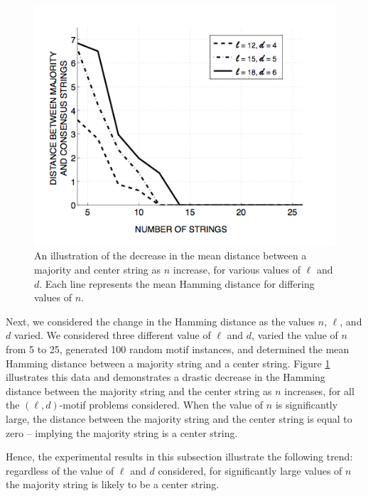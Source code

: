 \begin{figure}[h!]
\centering
\includegraphics[width=\linewidth]{images/graph2v2}%
 \caption[An illustration of the decrease in the mean distance between a majority and center string as $n$ increase, for various values of $\ell$ and $d$.]{An illustration of the decrease in the mean distance between a majority and center string as $n$ increase, for various values of $\ell$ and $d$. Each line represents the mean Hamming distance for differing values of $n$. }
\label{fig2}
\end{figure}
 
Next, we considered the change in the Hamming distance as the values $n$, $\ell$, and $d$ varied.  We considered three different value of $\ell$ and $d$, varied the value of $n$ from 5 to 25, generated 100 random motif instances, and determined the mean Hamming distance between a majority string and a center string.  Figure \ref{fig2} illustrates this data and demonstrates a drastic decrease in the Hamming distance between the majority string and the center string as $n$ increases, for all the $(\ell, d)$-motif problems considered.  When the value of $n$ is significantly large, the distance between the majority string and the center string is equal to zero -- implying the majority string is a center string. 

Hence, the experimental results in this subsection illustrate the following trend: regardless of the value of $\ell$ and $d$ considered, for significantly large values of $n$ the majority string is likely to be a center string. 

